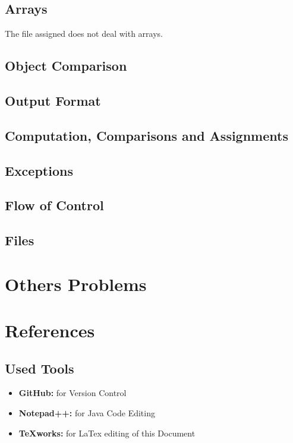 \documentclass[a4paper]{article}
\begin{document}
\subsection{Arrays}
The file assigned does not deal with arrays.
\subsection{Object Comparison}
\subsection{Output Format}
\subsection{Computation, Comparisons and Assignments}
\subsection{Exceptions}
\subsection{Flow of Control}
\subsection{Files}

\section{Others Problems}

\newpage
\section{References}
\subsection{Used Tools}
\begin{itemize}
	\item \textbf{GitHub:} for Version Control
	\item \textbf {Notepad++:} for Java Code Editing
	\item \textbf {TeXworks:} for LaTex editing of this Document
\end{itemize}

\newpage
\end{document}
